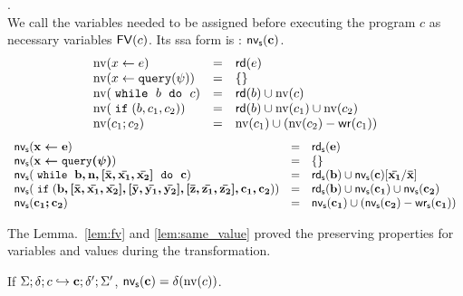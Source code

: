 \documentclass[a4paper,11pt]{article}
\begin{document}
\begin{defn}.
\\
{
We call the variables needed to be assigned before executing the program $c$ as necessary variables $\mathsf{FV} (c)$. Its ssa form is : $\mathsf{nv_s} (\boldsymbol{\mathbf{c}})$.
}  
 \[
 \begin{array}{lll}
     \text{nv}(\mathrel{ x \leftarrow e } )  & = & \mathsf{rd} (e)  \\
     \text{nv}(\mathrel{ x \leftarrow {\tt query}(\psi) } )  & = & \{ \}  \\
     {\text{nv}(  \;\mathtt{while}\; ~ b ~ \;\mathtt{do}\; ~ c  ) }&= & \mathsf{rd} (b) \cup \text{nv}(c) \\
     \text{nv}(\;\mathtt{if}\;(b, c_1, c_2)) & =& \mathsf{rd} (b) \cup \text{nv}(c_1) \cup \text{nv}(c_2)  \\
      \text{nv}(c_1 ; c_2) & = & \text{nv}(c_1) \cup ( \text{nv}(c_2) - \mathsf{wr} (c_1))
 \end{array}
 \]
 \[
 \begin{array}{lll}
     \mathsf{nv_s} (\boldsymbol{\mathbf{\mathrel{ x \leftarrow e }}} )  & = & \mathsf{rd_s} (\boldsymbol{\mathbf{e}})  \\
     \mathsf{nv_s} ( \boldsymbol{\mathbf{ \mathrel{ x \leftarrow {\tt query}(\psi) }}} )  & = & \{ \}  \\
     {\mathsf{nv_s} (  \;\mathtt{while}\; ~ \boldsymbol{\mathbf{b, n, [\bar{x}, \bar{x_1}, \bar{x_2}] ~ \;\mathtt{do}\; ~ c}} ) }
     &= & 
     \mathsf{rd_s} (\boldsymbol{\mathbf{b}}) \cup \mathsf{nv_s} (\boldsymbol{\mathbf{c}})[\boldsymbol{\mathbf{ \bar{x_1}}} / \boldsymbol{\mathbf{\bar{x}}}]\\
     \mathsf{nv_s} (\;\mathtt{if}\;(\boldsymbol{\mathbf{b,[\bar{x}, \bar{x_1}, \bar{x_2}],[\bar{y}, \bar{y_1}, \bar{y_2}],[\bar{z}, \bar{z_1}, \bar{z_2}], c_1, c_2}} )) & =& \mathsf{rd_s} (\boldsymbol{\mathbf{b}}) \cup \mathsf{nv_s} (\boldsymbol{\mathbf{c_1}}) \cup \mathsf{nv_s} (\boldsymbol{\mathbf{c_2}})  \\
      \mathsf{nv_s} (\boldsymbol{\mathbf{c_1 ; c_2}}) & = & \mathsf{nv_s} (\boldsymbol{\mathbf{c_1}}) \cup ( \mathsf{nv_s} (\boldsymbol{\mathbf{c_2}}) - \mathsf{wr_s} (\boldsymbol{\mathbf{c_1}}))
 \end{array}
 \]
%
\end{defn}
%
The Lemma.~\ref{lem:fv} and \ref{lem:same_value} proved the preserving properties for variables and values during the transformation.
%
\begin{lem}
\label{lem:fv}
If $\Sigma;\delta ; c \hookrightarrow \boldsymbol{\mathbf{c}} ; \delta';\Sigma' $, $\mathsf{nv_s} (\boldsymbol{\mathbf{c}}) = \delta(\text{nv}(c))$. 
\end{lem}
\end{document}
